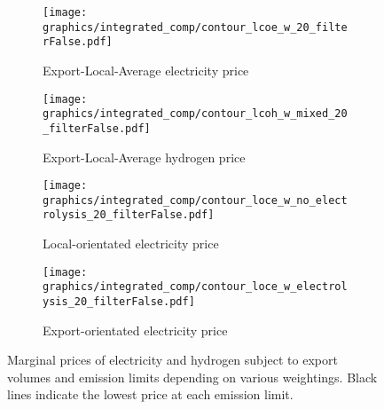 \begin{figure*}[t] %
    \centering
    \begin{subfigure}[b]{0.45\linewidth}
        \centering
        \texttt{[image: graphics/integrated\_comp/contour\_lcoe\_w\_20\_filterFalse.pdf]}
        \caption{Export-Local-Average electricity price}
        \label{fig:export_local_el_price}
    \end{subfigure}
    \hfill
    \begin{subfigure}[b]{0.45\linewidth}
        \centering
        \texttt{[image: graphics/integrated\_comp/contour\_lcoh\_w\_mixed\_20\_filterFalse.pdf]}
        \caption{Export-Local-Average hydrogen price}
        \label{fig:export_local_hy_price}
    \end{subfigure}
    \hfill
    \begin{subfigure}[b]{0.45\linewidth}
        \centering
        \texttt{[image: graphics/integrated\_comp/contour\_loce\_w\_no\_electrolysis\_20\_filterFalse.pdf]}
        \caption{Local-orientated electricity price}
        \label{fig:local_el_price_appendix}
    \end{subfigure}
    \hfill
    \begin{subfigure}[b]{0.45\linewidth}
        \centering
        \texttt{[image: graphics/integrated\_comp/contour\_loce\_w\_electrolysis\_20\_filterFalse.pdf]}
        \caption{Export-orientated electricity price}
        \label{fig:export_el_price}
    \end{subfigure}
    \hfill

    \caption{Marginal prices of electricity and hydrogen subject to export volumes and emission limits depending on various weightings. Black lines indicate the lowest price at each emission limit.}
    \label{fig:prices_all}
\end{figure*}